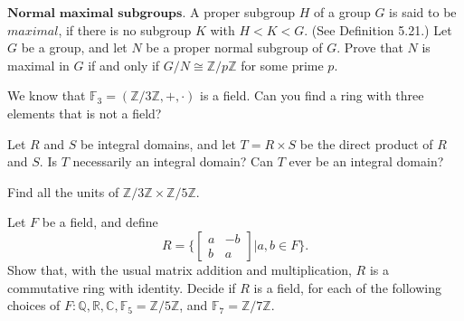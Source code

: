 \documentclass[12pt,letterpaper,boxed]{hmcpset}
\begin{document}

\begin{problem}[11.5.8]
$\textbf{Normal maximal subgroups.}$ A proper subgroup $H$ of a group $G$ is said to be $\textit{maximal}$, if there is no subgroup $K$ with $H < K < G$. (See Definition 5.21.) Let $G$ be a group, and let $N$ be a proper normal subgroup of $G$. Prove that $N$ is maximal in $G$ if and only if $G/N \cong \mathbb{Z}/p\mathbb{Z}$ for some prime $p$.
\end{problem}

\begin{solution}
\end{solution}

\clearpage

\begin{problem}[15.2.1]
We know that $\mathbb{F}_3 = (\mathbb{Z}/3\mathbb{Z},+,\cdot)$ is a field. Can you find a ring with three elements that is not a field?
\end{problem}

\begin{solution}
\end{solution}

\clearpage

\begin{problem}[15.2.4]
Let $R$ and $S$ be integral domains, and let $T = R \times S$ be the direct product of $R$ and $S$. Is $T$ necessarily an integral domain? Can $T$ ever be an integral domain?
\end{problem}

\begin{solution}
\end{solution}

\clearpage

\begin{problem}[15.2.5]
Find all the units of $\mathbb{Z}/3\mathbb{Z} \times \mathbb{Z}/5\mathbb{Z}$. 
\end{problem}

\begin{solution}
\end{solution}

\clearpage

\begin{problem}[15.2.12]
Let $F$ be a field, and define
$$ R = \{ 
\begin{bmatrix}
a & -b \\
b & a
\end{bmatrix}
\vert a,b \in F
\}.$$
Show that, with the usual matrix addition and multiplication, $R$ is a commutative ring with identity. Decide if $R$ is a field, for each of the following choices of $F: \mathbb{Q}, \mathbb{R}, \mathbb{C}, \mathbb{F}_5 = \mathbb{Z}/5\mathbb{Z}$, and $\mathbb{F}_7 = \mathbb{Z}/7\mathbb{Z}$. 
\end{problem}

\begin{solution}

\end{solution}
\end{document}
